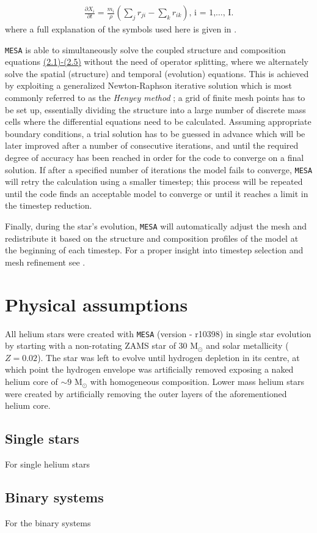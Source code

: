 \documentclass[../../main/thesis_msc.tex]{subfiles}
\begin{document}
    			\begin{eqnarray}
    				\frac{\partial X_i}{\partial t} = \frac{m_i}{\rho} \left( \sum_j r_{ji} - \sum_k r_{ik} \right) \text{, i = 1,$\dots$, I.} \label{eq:2.5}
    			\end{eqnarray}
    			where a full explanation of the symbols used here is given in \cite[][p. 89]{Kipp_book}. 
    			
    			\texttt{MESA} is able to simultaneously solve the coupled structure and composition equations \hyperref[eq:2.1]{(2.1)-(2.5)} without the need of operator splitting, where we alternately solve the spatial (structure) and temporal (evolution) equations. This is achieved by exploiting a generalized Newton-Raphson iterative solution which is most commonly referred to as the \emph{Henyey method} \citep[][p. 106]{Wilson1981, Kipp_book}; a grid of finite mesh points has to be set up, essentially dividing the structure into a large number of discrete mass cells where the differential equations need to be calculated. Assuming appropriate boundary conditions, a trial solution has to be guessed in advance which will be later improved after a number of consecutive iterations, and until the required degree of accuracy has been reached in order for the code to converge on a final solution. If after a specified number of iterations the model fails to converge, \texttt{MESA} will retry the calculation using a smaller timestep; this process will be repeated until the code finds an acceptable model to converge or until it reaches a limit in the timestep reduction.
    			
    			Finally, during the star's evolution, \texttt{MESA} will automatically adjust the mesh and redistribute it based on the structure and composition profiles of the model at the beginning of each timestep. For a proper insight into timestep selection and mesh refinement see \cite{Paxton2011}.
    			
    		\section{Physical assumptions}
    		
    			All helium stars were created with \texttt{MESA} (version - r10398) in single star evolution by starting with a non-rotating ZAMS star of $30$ M$_{\odot}$ and solar metallicity ($Z = 0.02$). The star was left to evolve until hydrogen depletion in its centre, at which point the hydrogen envelope was artificially removed exposing a naked helium core of $\sim 9$ M$_{\odot}$ with homogeneous composition. Lower mass helium stars were created by artificially removing the outer layers of the aforementioned helium core.
    			
    				\subsection{Single stars}
    				
    					For single helium stars
    					
    				\subsection{Binary systems}
    				
    					For the binary systems
    
    
    
    
\end{document}
